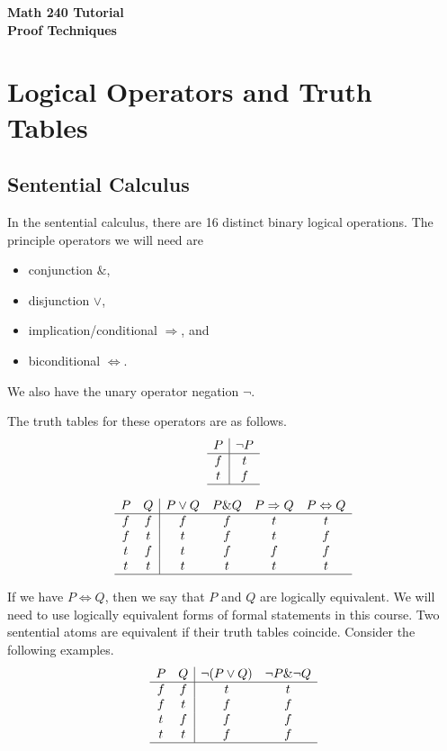 \documentclass[a4paper,11pt]{article}
\begin{document}
\begin{center}
  {\Large\bfseries Math 240 Tutorial \\ Proof Techniques}
\end{center}

\section{Logical Operators and Truth Tables}

\subsection*{Sentential Calculus}

In the sentential calculus, there are 16 distinct binary logical operations. The
principle operators we will need are
\begin{itemize}
\item conjunction $\&$,
\item disjunction $\vee$, 
\item implication/conditional $\Rightarrow$, and
\item biconditional $\Leftrightarrow$.
\end{itemize}

\noindent We also have the unary operator negation $\neg$.

The truth tables for these operators are as follows.
\[
  \begin{array}{c|c}
    P & \neg P \\ \hline
    f & t \\
    t & f \\ \hline
  \end{array}
\]

\[
  \begin{array}{cc|cccc}
    P & Q & P \vee Q & P \& Q & P \Rightarrow Q & P \Leftrightarrow Q \\ \hline
    f & f & f & f & t & t \\
    f & t & t & f & t & f \\
    t & f & t & f & f & f \\
    t & t & t & t & t & t \\ \hline
  \end{array}
\]

If we have $P \Leftrightarrow Q$, then we say that $P$ and $Q$ are logically
equivalent. We will need to use logically equivalent forms of formal statements
in this course. Two sentential atoms are equivalent if their truth tables
coincide. Consider the following examples.
\[
  \begin{array}{cc|cc}
    P & Q & \neg(P \vee Q) & \neg P \& \neg Q \\ \hline
    f & f & t & t  \\
    f & t & f & f  \\
    t & f & f & f  \\
    t & t & f & f  \\ \hline
  \end{array}
\]
\end{document}
